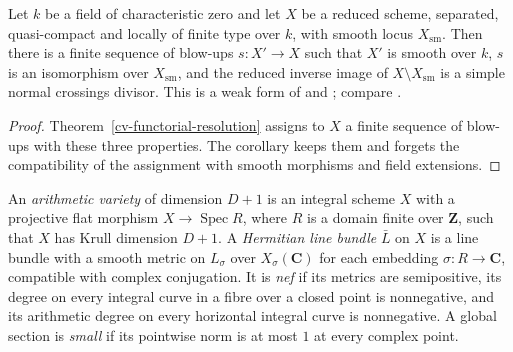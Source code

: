 \begin{corollary}\label{lit-resolution}
Let $k$ be a field of characteristic zero and let $X$ be a reduced scheme,
separated, quasi-compact and locally of finite type over $k$, with smooth locus
$X_{\mathrm{sm}}$. Then there is a finite sequence of blow-ups $s:X'\to X$ such
that $X'$ is smooth over $k$, $s$ is an isomorphism over $X_{\mathrm{sm}}$,
and the reduced inverse image of $X\setminus X_{\mathrm{sm}}$ is a simple
normal crossings divisor. This is a weak form of \cite[Main Theorem I]{Hir64}
and \cite[Theorem 36]{Kol07}; compare \cite[Tag R02G]{Res26}.
\end{corollary}
\begin{proof}
Theorem~\ref{cv-functorial-resolution} assigns to $X$ a finite sequence of
blow-ups with these three properties. The corollary keeps them and forgets
the compatibility of the assignment with smooth morphisms and field
extensions.
\end{proof}

\begin{definition}\label{lit-arithmetic-variety}
An \emph{arithmetic variety} of dimension $D+1$ is an integral scheme $X$ with
a projective flat morphism $X\to\operatorname{Spec}R$, where $R$ is a domain
finite over $\mathbf Z$, such that $X$ has Krull dimension $D+1$. A
\emph{Hermitian line bundle} $\bar L$ on $X$ is a line bundle with a smooth
metric on $L_\sigma$ over $X_\sigma(\mathbf C)$ for each embedding
$\sigma:R\to\mathbf C$, compatible with complex conjugation. It is \emph{nef}
if its metrics are semipositive, its degree on every integral curve in a
fibre over a closed point is nonnegative, and its arithmetic degree on every
horizontal integral curve is nonnegative. A global section is \emph{small} if
its pointwise norm is at most $1$ at every complex point.
\end{definition}

